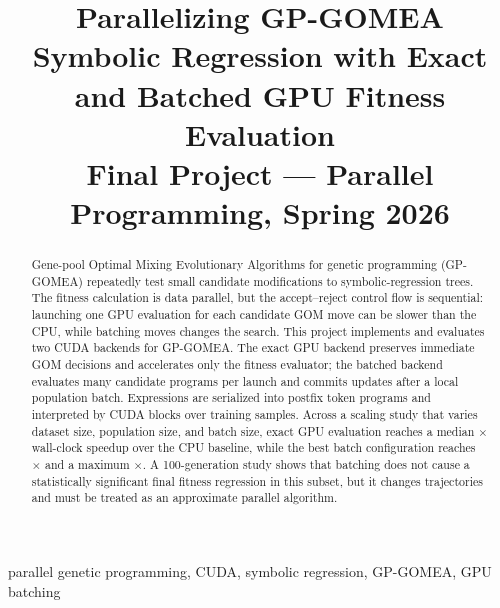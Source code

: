 \documentclass[conference]{IEEEtran}
\newcommand{\gpgomea}{GP-GOMEA\xspace}
\begin{document}

\title{Parallelizing GP-GOMEA Symbolic Regression with Exact and Batched GPU Fitness Evaluation\\
{\footnotesize Final Project --- Parallel Programming, Spring 2026}}

\author{%
}

\maketitle

\begin{abstract}
Gene-pool Optimal Mixing Evolutionary Algorithms for genetic programming
(\gpgomea) repeatedly test small candidate modifications to symbolic-regression
trees. The fitness calculation is data parallel, but the accept--reject control
flow is sequential: launching one GPU evaluation for each candidate GOM move can
be slower than the CPU, while batching moves changes the search. This project
implements and evaluates two CUDA backends for \gpgomea. The exact GPU backend
preserves immediate GOM decisions and accelerates only the fitness evaluator;
the batched backend evaluates many candidate programs per launch and commits
updates after a local population batch. Expressions are serialized into postfix
token programs and interpreted by CUDA blocks over training samples. Across a
scaling study that varies dataset size, population size, and batch size, exact
GPU evaluation reaches a median \ExactMedianSpeedup$\times$ wall-clock speedup
over the CPU baseline, while the best batch configuration reaches
\BestBatchMedianSpeedup$\times$ and a maximum \BestBatchMaxSpeedup$\times$. A
100-generation study shows that batching does not cause a statistically
significant final fitness regression in this subset, but it changes trajectories
and must be treated as an approximate parallel algorithm.
\end{abstract}

\begin{IEEEkeywords}
parallel genetic programming, CUDA, symbolic regression, GP-GOMEA, GPU batching
\end{IEEEkeywords}

\vspace{0.5em}
\noindent{}
\end{document}
